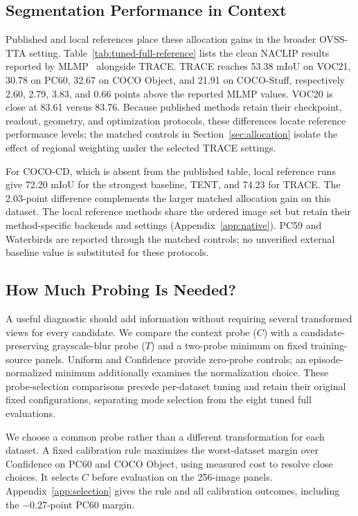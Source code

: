 \documentclass[letterpaper]{article}
\begin{document}
\subsection{Segmentation Performance in Context}
Published and local references place these allocation gains in the broader OVSS-TTA setting. Table~\ref{tab:tuned-full-reference} lists the clean NACLIP results reported by MLMP~\cite{noori2025mlmp} alongside TRACE. TRACE reaches 53.38 mIoU on VOC21, 30.78 on PC60, 32.67 on COCO Object, and 21.91 on COCO-Stuff, respectively 2.60, 2.79, 3.83, and 0.66 points above the reported MLMP values. VOC20 is close at 83.61 versus 83.76. Because published methods retain their checkpoint, readout, geometry, and optimization protocols, these differences locate reference performance levels; the matched controls in Section~\ref{sec:allocation} isolate the effect of regional weighting under the selected TRACE settings.



For COCO-CD, which is absent from the published table, local reference runs give 72.20 mIoU for the strongest baseline, TENT, and 74.23 for TRACE. The 2.03-point difference complements the larger matched allocation gain on this dataset. The local reference methods share the ordered image set but retain their method-specific backends and settings (Appendix~\ref{app:native}). PC59 and Waterbirds are reported through the matched controls; no unverified external baseline value is substituted for these protocols.

\subsection{How Much Probing Is Needed?}
A useful diagnostic should add information without requiring several transformed views for every candidate. We compare the context probe ($C$) with a candidate-preserving grayscale-blur probe ($T$) and a two-probe minimum on fixed training-source panels. Uniform and Confidence provide zero-probe controls; an episode-normalized minimum additionally examines the normalization choice. These probe-selection comparisons precede per-dataset tuning and retain their original fixed configurations, separating mode selection from the eight tuned full evaluations.

We choose a common probe rather than a different transformation for each dataset. A fixed calibration rule maximizes the worst-dataset margin over Confidence on PC60 and COCO Object, using measured cost to resolve close choices. It selects $C$ before evaluation on the 256-image panels. Appendix~\ref{app:selection} gives the rule and all calibration outcomes, including the $-0.27$-point PC60 margin.
\end{document}
